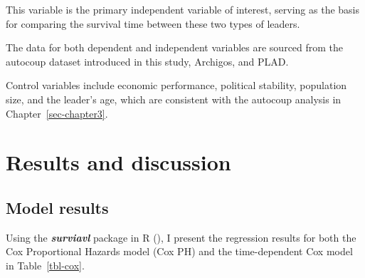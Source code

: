 \documentclass[
  12pt,
]{report}
\begin{document}
This variable is the primary independent variable of interest, serving
as the basis for comparing the survival time between these two types of
leaders.

The data for both dependent and independent variables are sourced from
the autocoup dataset introduced in this study, Archigos, and PLAD.

Control variables include economic performance, political stability,
population size, and the leader's age, which are consistent with the
autocoup analysis in Chapter~\ref{sec-chapter3}.

\section{Results and discussion}\label{results-and-discussion-1}

\subsection{Model results}\label{model-results}

Using the \textbf{\emph{surviavl}} package in R
(), I present the regression
results for both the Cox Proportional Hazards model (Cox PH) and the
time-dependent Cox model in Table~\ref{tbl-cox}.
\end{document}
